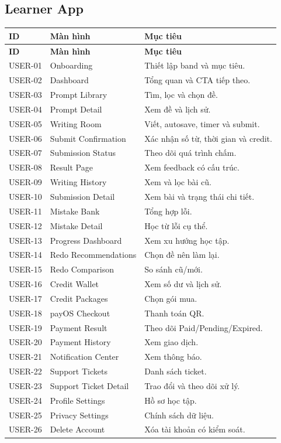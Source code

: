 \documentclass[11pt,a4paper]{article}
\begin{document}
\subsection{Learner App}
\begin{longtable}{|P{0.14\textwidth}|P{0.31\textwidth}|P{0.45\textwidth}|}
\hline
\textbf{ID} & \textbf{Màn hình} & \textbf{Mục tiêu} \\ \hline
\endfirsthead
\hline
\textbf{ID} & \textbf{Màn hình} & \textbf{Mục tiêu} \\ \hline
\endhead
USER-01 & Onboarding & Thiết lập band và mục tiêu. \\ \hline
USER-02 & Dashboard & Tổng quan và CTA tiếp theo. \\ \hline
USER-03 & Prompt Library & Tìm, lọc và chọn đề. \\ \hline
USER-04 & Prompt Detail & Xem đề và lịch sử. \\ \hline
USER-05 & Writing Room & Viết, autosave, timer và submit. \\ \hline
USER-06 & Submit Confirmation & Xác nhận số từ, thời gian và credit. \\ \hline
USER-07 & Submission Status & Theo dõi quá trình chấm. \\ \hline
USER-08 & Result Page & Xem feedback có cấu trúc. \\ \hline
USER-09 & Writing History & Xem và lọc bài cũ. \\ \hline
USER-10 & Submission Detail & Xem bài và trạng thái chi tiết. \\ \hline
USER-11 & Mistake Bank & Tổng hợp lỗi. \\ \hline
USER-12 & Mistake Detail & Học từ lỗi cụ thể. \\ \hline
USER-13 & Progress Dashboard & Xem xu hướng học tập. \\ \hline
USER-14 & Redo Recommendations & Chọn đề nên làm lại. \\ \hline
USER-15 & Redo Comparison & So sánh cũ/mới. \\ \hline
USER-16 & Credit Wallet & Xem số dư và lịch sử. \\ \hline
USER-17 & Credit Packages & Chọn gói mua. \\ \hline
USER-18 & payOS Checkout & Thanh toán QR. \\ \hline
USER-19 & Payment Result & Theo dõi Paid/Pending/Expired. \\ \hline
USER-20 & Payment History & Xem giao dịch. \\ \hline
USER-21 & Notification Center & Xem thông báo. \\ \hline
USER-22 & Support Tickets & Danh sách ticket. \\ \hline
USER-23 & Support Ticket Detail & Trao đổi và theo dõi xử lý. \\ \hline
USER-24 & Profile Settings & Hồ sơ học tập. \\ \hline
USER-25 & Privacy Settings & Chính sách dữ liệu. \\ \hline
USER-26 & Delete Account & Xóa tài khoản có kiểm soát. \\ \hline
\end{longtable}
\end{document}
